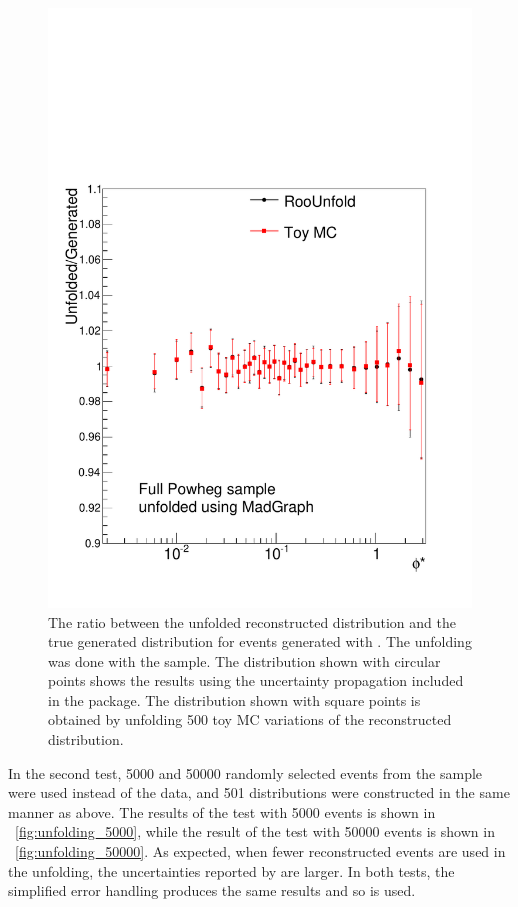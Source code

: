 \begin{figure}[!htbp]
    \centering
    \includegraphics[width=\SideBySidePlotWidth]{figures/BinM_MP_ALL.pdf}
    \caption{
        The ratio between the unfolded reconstructed \phistar distribution and
        the true generated \phistar distribution for \Ztoee events generated
        with \POWHEG. The unfolding was done with the \MADGRAPH sample. The
        distribution shown with circular points shows the results using the
        uncertainty propagation included in the \RooUnfold package. The
        distribution shown with square points is obtained by unfolding 500 toy
        MC variations of the reconstructed \phistar distribution.
    }
    \label{fig:toy_unfolding_results}
\end{figure}

In the second test, \num{5000} and \num{50000} randomly selected events from
the \POWHEG sample were used instead of the data, and 501 distributions were
constructed in the same manner as above. The results of the test with
\num{5000} events is shown in \FIG~\ref{fig:unfolding_5000}, while the result
of the test with \num{50000} events is shown in \FIG~\ref{fig:unfolding_50000}.
As expected, when fewer reconstructed events are used in the unfolding, the
uncertainties reported by \RooUnfold are larger. In both tests, the simplified
error handling produces the same results and so is used.

